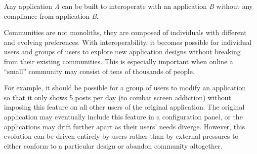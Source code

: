 

\begin{requirement}
\label{requirements:adversarial-interop}
Any application \emph{A} can be built to interoperate with an application \emph{B} without any compliance from application \emph{B}.
\end{requirement}

Communities are not monoliths, they are composed of individuals
with different and evolving preferences.
With interoperability, it becomes possible for individual users and groups of users to explore new application designs
without breaking from their existing communities.
This is especially important when online a ``small''
community may consist of tens of thousands of people.

For example, it should be possible for a group of users to
modify an application so that it only shows 5 posts per day (to combat screen addiction)
without imposing this feature on all other users of the original application.
The original application may eventually include this feature in a configuration panel,
or the applications may drift further apart as their users' needs diverge. However, this
evolution can be driven entirely by users rather than by external pressures
to either conform to a particular design or abandon community altogether.


